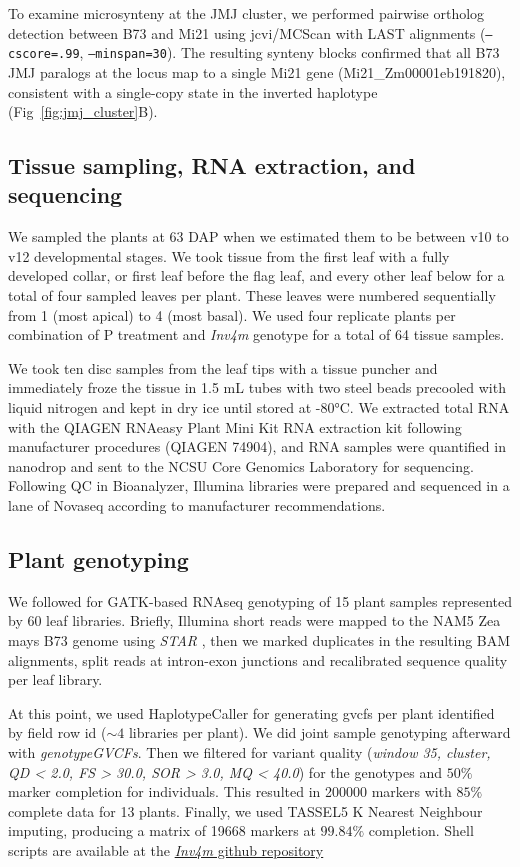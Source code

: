 \documentclass[9pt,twocolumn,twoside]{rilabRxiv}
\newcommand{\invfour}{\textit{Inv4m}\xspace}
\begin{document}
To examine microsynteny at the JMJ cluster, we performed pairwise ortholog detection between B73 and Mi21 using jcvi/MCScan \cite{tang2008jcvi} with LAST \cite{kielbasa2011} alignments (\texttt{--cscore=.99}, \texttt{--minspan=30}).
The resulting synteny blocks confirmed that all B73 JMJ paralogs at the locus map to a single Mi21 gene (Mi21\_Zm00001eb191820), consistent with a single-copy state in the inverted haplotype (Fig~\ref{fig:jmj_cluster}B).

\subsection{Tissue sampling, RNA extraction, and sequencing}

We sampled the plants at 63 DAP when we estimated them to be between v10 to v12 developmental stages.
We took tissue from the first leaf with a fully developed collar, or first leaf before the flag leaf, and every other leaf below for a total of four sampled leaves per plant.
These leaves were numbered sequentially from 1 (most apical) to 4 (most basal).
We used four replicate plants per combination of P treatment and \invfour genotype for a total of 64 tissue samples.

We took ten disc samples from the leaf tips with a tissue puncher and immediately froze the tissue in 1.5 mL tubes with two steel beads precooled with liquid nitrogen and kept in dry ice until stored at -80°C.
We extracted total RNA with the QIAGEN RNAeasy Plant Mini Kit RNA extraction kit following manufacturer procedures (QIAGEN 74904), and RNA samples were quantified in nanodrop and sent to the NCSU Core Genomics Laboratory for sequencing.
Following QC in Bioanalyzer, Illumina libraries were prepared and sequenced in a lane of Novaseq according to manufacturer recommendations.

\subsection{Plant genotyping}

We followed \cite{brouard2022} for GATK-based RNAseq genotyping of 15 plant samples represented by 60 leaf libraries.
Briefly, Illumina short reads were mapped to the NAM5 Zea mays B73 genome \cite{hufford2021} using \textit{STAR} \cite{dobin2013}, then we marked duplicates in the resulting BAM alignments, split reads at intron-exon junctions and recalibrated sequence quality per leaf library.

At this point, we used HaplotypeCaller for generating gvcfs per plant identified by field row id ($\sim 4$ libraries per plant).
We did joint sample genotyping afterward with \textit{genotypeGVCFs}.
Then we filtered for variant quality (\textit{window 35, cluster, QD < 2.0, FS > 30.0, SOR > 3.0, MQ < 40.0}) for the genotypes and $50\%$ marker completion for individuals.
This resulted in 200000 markers with $85\%$ complete data for 13 plants.
Finally, we used TASSEL5 K Nearest Neighbour imputing, producing a matrix of 19668 markers at $99.84\%$ completion.
Shell scripts are available at the \href{https://github.com/sawers-rellan-labs/inv4m} {\invfour github repository}
\end{document}
